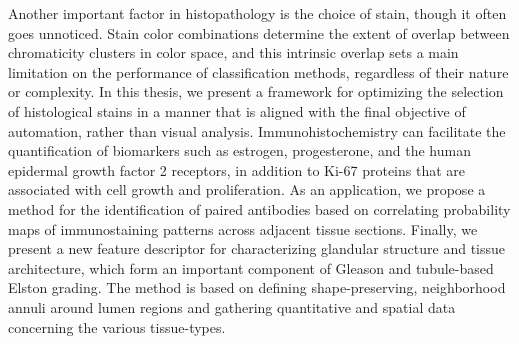 {\begin{enumerate}
Another important factor in histopathology is the choice of stain, though it often goes unnoticed. Stain color combinations determine the extent of overlap between chromaticity clusters in color space, and this intrinsic overlap sets a main limitation on the performance of classification methods, regardless of their nature or complexity. In this thesis, we present a framework for optimizing the selection of histological stains in a manner that is aligned with the final objective of automation, rather than visual analysis.
Immunohistochemistry can facilitate the quantification of biomarkers such as estrogen, progesterone, and the human epidermal growth factor 2 receptors, in addition to Ki-67 proteins that are associated with cell growth and proliferation. As an application, we propose a method for the identification of paired antibodies based on correlating probability maps of immunostaining patterns across adjacent tissue sections.
Finally, we present a new feature descriptor for characterizing glandular structure and tissue architecture, which form an important component of Gleason and tubule-based Elston grading. The method is based on defining shape-preserving, neighborhood annuli around lumen regions
and gathering quantitative and spatial data concerning the various tissue-types.




\end{enumerate}}
